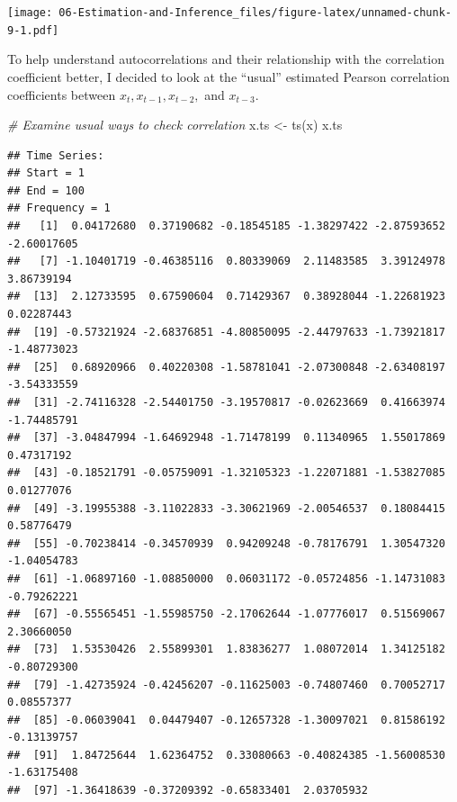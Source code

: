 \documentclass[
]{book}
\newenvironment{Shaded}{\begin{snugshade}}{\end{snugshade}}
\newcommand{\CommentTok}[1]{\textcolor[rgb]{0.56,0.35,0.01}{\textit{#1}}}
\newcommand{\FunctionTok}[1]{\textcolor[rgb]{0.00,0.00,0.00}{#1}}
\newcommand{\NormalTok}[1]{#1}
\newcommand{\OtherTok}[1]{\textcolor[rgb]{0.56,0.35,0.01}{#1}}
\theoremstyle{definition}
\theoremstyle{definition}
\theoremstyle{definition}
\theoremstyle{definition}
\theoremstyle{remark}
\begin{document}
\texttt{[image: 06-Estimation-and-Inference\_files/figure-latex/unnamed-chunk-9-1.pdf]}

To help understand autocorrelations and their relationship with the correlation coefficient better, I decided to look at the ``usual'' estimated Pearson correlation coefficients between \(x_t, x_{t-1}, x_{t-2},\) and \(x_{t-3}\).

\begin{Shaded}
\begin{Highlighting}[]
\CommentTok{\# Examine usual ways to check correlation}
\NormalTok{x.ts }\OtherTok{\textless{}{-}} \FunctionTok{ts}\NormalTok{(x)}
\NormalTok{x.ts}
\end{Highlighting}
\end{Shaded}

\begin{verbatim}
## Time Series:
## Start = 1 
## End = 100 
## Frequency = 1 
##   [1]  0.04172680  0.37190682 -0.18545185 -1.38297422 -2.87593652 -2.60017605
##   [7] -1.10401719 -0.46385116  0.80339069  2.11483585  3.39124978  3.86739194
##  [13]  2.12733595  0.67590604  0.71429367  0.38928044 -1.22681923  0.02287443
##  [19] -0.57321924 -2.68376851 -4.80850095 -2.44797633 -1.73921817 -1.48773023
##  [25]  0.68920966  0.40220308 -1.58781041 -2.07300848 -2.63408197 -3.54333559
##  [31] -2.74116328 -2.54401750 -3.19570817 -0.02623669  0.41663974 -1.74485791
##  [37] -3.04847994 -1.64692948 -1.71478199  0.11340965  1.55017869  0.47317192
##  [43] -0.18521791 -0.05759091 -1.32105323 -1.22071881 -1.53827085  0.01277076
##  [49] -3.19955388 -3.11022833 -3.30621969 -2.00546537  0.18084415  0.58776479
##  [55] -0.70238414 -0.34570939  0.94209248 -0.78176791  1.30547320 -1.04054783
##  [61] -1.06897160 -1.08850000  0.06031172 -0.05724856 -1.14731083 -0.79262221
##  [67] -0.55565451 -1.55985750 -2.17062644 -1.07776017  0.51569067  2.30660050
##  [73]  1.53530426  2.55899301  1.83836277  1.08072014  1.34125182 -0.80729300
##  [79] -1.42735924 -0.42456207 -0.11625003 -0.74807460  0.70052717  0.08557377
##  [85] -0.06039041  0.04479407 -0.12657328 -1.30097021  0.81586192 -0.13139757
##  [91]  1.84725644  1.62364752  0.33080663 -0.40824385 -1.56008530 -1.63175408
##  [97] -1.36418639 -0.37209392 -0.65833401  2.03705932
\end{verbatim}
\end{document}
